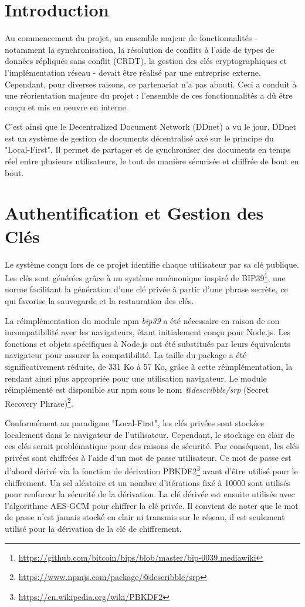 \section{Introduction}

Au commencement du projet, un ensemble majeur de fonctionnalités - notamment la synchronisation, la résolution de conflits à l'aide de types de données répliqués sans conflit (CRDT), la gestion des clés cryptographiques et l'implémentation réseau - devait être réalisé par une entreprise externe. Cependant, pour diverses raisons, ce partenariat n'a pas abouti. Ceci a conduit à une réorientation majeure du projet : l'ensemble de ces fonctionnalités a dû être conçu et mis en oeuvre en interne.

C'est ainsi que le Decentralized Document Network (DDnet) a vu le jour. DDnet est un système de gestion de documents décentralisé axé sur le principe du "Local-First". Il permet de partager et de synchroniser des documents en temps réel entre plusieurs utilisateurs, le tout de manière sécurisée et chiffrée de bout en bout.

\section{Authentification et Gestion des Clés}

Le système conçu lors de ce projet identifie chaque utilisateur par sa clé publique. Les clés sont générées grâce à un système mnémonique inspiré de BIP39\footnote{\url{https://github.com/bitcoin/bips/blob/master/bip-0039.mediawiki}}, une norme facilitant la génération d'une clé privée à partir d'une phrase secrète, ce qui favorise la sauvegarde et la restauration des clés.

La réimplémentation du module npm \textit{bip39} a été nécessaire en raison de son incompatibilité avec les navigateurs, étant initialement conçu pour Node.js. Les fonctions et objets spécifiques à Node.js ont été substitués par leurs équivalents navigateur pour assurer la compatibilité. La taille du package a été significativement réduite, de 331 Ko à 57 Ko, grâce à cette réimplémentation, la rendant ainsi plus appropriée pour une utilisation navigateur. Le module réimplémenté est disponible sur npm sous le nom \textit{@describble/srp} (Secret Recovery Phrase)\footnote{\url{https://www.npmjs.com/package/@describble/srp}}.

Conformément au paradigme "Local-First", les clés privées sont stockées localement dans le navigateur de l'utilisateur. Cependant, le stockage en clair de ces clés serait problématique pour des raisons de sécurité. Par conséquent, les clés privées sont chiffrées à l'aide d'un mot de passe utilisateur. Ce mot de passe est d'abord dérivé via la fonction de dérivation PBKDF2\footnote{\url{https://en.wikipedia.org/wiki/PBKDF2}} avant d'être utilisé pour le chiffrement. Un sel aléatoire et un nombre d'itérations fixé à 10000 sont utilisés pour renforcer la sécurité de la dérivation. La clé dérivée est ensuite utilisée avec l'algorithme AES-GCM pour chiffrer la clé privée. Il convient de noter que le mot de passe n'est jamais stocké en clair ni transmis sur le réseau, il est seulement utilisé pour la dérivation de la clé de chiffrement.

